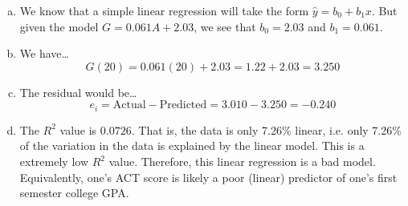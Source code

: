 \documentclass[11pt,letterpaper]{article}
\begin{document}
\sol 
\begin{enumerate}[(a)]
\item We know that a simple linear regression will take the form $\widehat{y}= b_0 + b_1 x$. But given the model $G= 0.061A + 2.03$, we see that $b_0= 2.03$ and $b_1= 0.061$. \pspace

\item We have\dots
	\[
	G(20)= 0.061(20) + 2.03= 1.22 + 2.03= 3.250
	\] \pspace

\item The residual would be\dots
	\[
	e_i= \text{Actual} - \text{Predicted}= 3.010 - 3.250= -0.240
	\] \pspace

\item The $R^2$ value is $0.0726$. That is, the data is only 7.26\% linear, i.e. only 7.26\% of the variation in the data is explained by the linear model. This is a extremely low $R^2$ value. Therefore, this linear regression is a bad model. Equivalently, one's ACT score is likely a poor (linear) predictor of one's first semester college GPA. 
\end{enumerate}



\newpage
\end{document}
